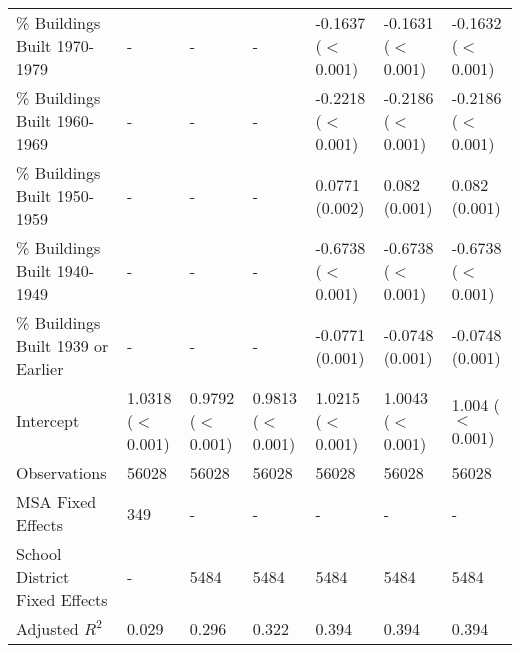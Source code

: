 \begin{landscape}
\begin{table}[h]
\begin{tabular}{l|llllll}
\% Buildings Built 1970-1979 &- & - & - & -0.1637 ($<$0.001) & -0.1631 ($<$0.001) & -0.1632 ($<$0.001) \\
\% Buildings Built 1960-1969 &- & - & - & -0.2218 ($<$0.001) & -0.2186 ($<$0.001) & -0.2186 ($<$0.001) \\
\% Buildings Built 1950-1959 &- & - & - & 0.0771 (0.002) & 0.082 (0.001) & 0.082 (0.001) \\
\% Buildings Built 1940-1949 &- & - & - & -0.6738 ($<$0.001) & -0.6738 ($<$0.001) & -0.6738 ($<$0.001) \\
\% Buildings Built 1939 or Earlier &- & - & - & -0.0771 (0.001) & -0.0748 (0.001) & -0.0748 (0.001) \\
Intercept &1.0318 ($<$0.001) & 0.9792 ($<$0.001) & 0.9813 ($<$0.001) & 1.0215 ($<$0.001) & 1.0043 ($<$0.001) & 1.004 ($<$0.001) \\
Observations &56028 & 56028 & 56028 & 56028 & 56028 & 56028 \\
MSA Fixed Effects &349 & - & - & - & - & - \\
School District Fixed Effects &- & 5484 & 5484 & 5484 & 5484 & 5484 \\
Adjusted $R^2$ &0.029 & 0.296 & 0.322 & 0.394 & 0.394 & 0.394 \\\hline
\end{tabular}
\end{table}
\newpage
\end{landscape}
\restoregeometry
